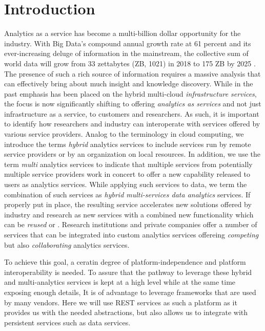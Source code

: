 
\section{Introduction}
\label{sec:summary}


Analytics as a service has become a multi-billion dollar opportunity
for the industry. With Big Data's compound annual growth rate at 61
percent and its ever-increasing deluge of information in the
mainstream, the collective sum of world data will grow from 33
zettabytes (ZB, 1021) in 2018 to 175 ZB by 2025 . The presence of such a rich source
of information requires a massive analysis that can effectively bring
about much insight and knowledge discovery.  While in the past
emphasis has been placed on the hybrid multi-cloud {\em infrastructure
services}, the focus is now significantly shifting to offering {\em
analytics as services} and not just infrastructure as a service, to
customers and researchers. As such, it is important to identify how
researchers and industry can interoperate with services offered by
various service providers. Analog to the terminology in cloud
computing, we introduce the terms {\em hybrid} analytics services to
include services run by remote service providers or by an organization
on local resources.  In addition, we use the term {\em multi}
analytics services to indicate that multiple services from potentially
multiple service providers work in concert to offer a new capability
released to users as analytics services. While applying such services
to data, we term the combination of such services as {\em hybrid
multi-services data analytics} services. If properly put in place, the
resulting service accelerates new solutions offered by industry and
research as new services with a combined new functionality which can
be {\em reused} or {\replicated}. Research institutions and private
companies offer a number of services that can be integrated into
custom analytics services offereing {\em competing} but also {\em
collaborating} analytics services.

To achieve this goal, a ceratin degree of platform-independence and
platform interoperability is needed.  To assure that the pathway to
leverage these hybrid and multi-analytics services is kept at a high
level while at the same time exposing enough details, It is of
advantage to leverage frameworks that are used by many vendors. Here
we will use REST services as such a platform as it provides us with
the needed abstractions, but also allows us to integrate with
persistent services such as data services.


